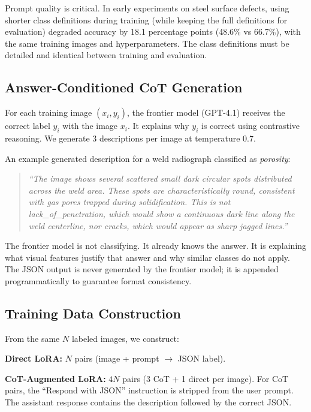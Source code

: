 \documentclass[11pt]{article}
\begin{document}
Prompt quality is critical. In early experiments on steel surface defects, using shorter class definitions during training (while keeping the full definitions for evaluation) degraded accuracy by 18.1 percentage points (48.6\% vs 66.7\%), with the same training images and hyperparameters. The class definitions must be detailed and identical between training and evaluation.

\subsection{Answer-Conditioned CoT Generation}

For each training image $(x_i, y_i)$, the frontier model (GPT-4.1) receives the correct label $y_i$ with the image $x_i$. It explains why $y_i$ is correct using contrastive reasoning. We generate 3 descriptions per image at temperature 0.7.

An example generated description for a weld radiograph classified as \textit{porosity}:

\begin{quote}
\small\textit{``The image shows several scattered small dark circular spots distributed across the weld area. These spots are characteristically round, consistent with gas pores trapped during solidification. This is not lack\_of\_penetration, which would show a continuous dark line along the weld centerline, nor cracks, which would appear as sharp jagged lines.''}
\end{quote}

The frontier model is not classifying. It already knows the answer. It is explaining what visual features justify that answer and why similar classes do not apply. The JSON output is never generated by the frontier model; it is appended programmatically to guarantee format consistency.

\subsection{Training Data Construction}

From the same $N$ labeled images, we construct:

\textbf{Direct LoRA:} $N$ pairs (image + prompt $\rightarrow$ JSON label).

\textbf{CoT-Augmented LoRA:} $4N$ pairs (3 CoT + 1 direct per image). For CoT pairs, the ``Respond with JSON'' instruction is stripped from the user prompt. The assistant response contains the description followed by the correct JSON.
\end{document}

